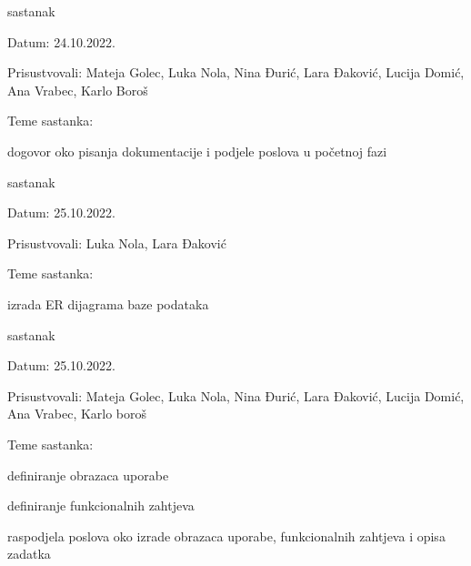 \begin{packed_enum}
			\item  sastanak
			\item[] \begin{packed_item}
				\item Datum:  24.10.2022.
				\item Prisustvovali: Mateja Golec, Luka Nola, Nina Đurić, Lara Đaković, Lucija Domić, Ana Vrabec, Karlo Boroš
				\item Teme sastanka:
				\begin{packed_item}
					\item  dogovor oko pisanja dokumentacije i podjele poslova u početnoj fazi
				\end{packed_item}
			\end{packed_item}
			
			\item  sastanak
			\item[] \begin{packed_item}
				\item Datum:  25.10.2022.
				\item Prisustvovali: Luka Nola, Lara Đaković
				\item Teme sastanka:
				\begin{packed_item}
					\item  izrada ER dijagrama baze podataka
				\end{packed_item}
			\end{packed_item}

			\item  sastanak
			\item[] \begin{packed_item}
				\item Datum: 25.10.2022.
				\item Prisustvovali: Mateja Golec, Luka Nola, Nina Đurić, Lara Đaković, Lucija Domić, Ana Vrabec, Karlo boroš
				\item Teme sastanka:
				\begin{packed_item}
					\item  definiranje obrazaca uporabe
					\item  definiranje funkcionalnih zahtjeva
					\item  raspodjela poslova oko izrade obrazaca uporabe, funkcionalnih zahtjeva i opisa zadatka
				\end{packed_item}
			\end{packed_item}


\end{packed_enum}
